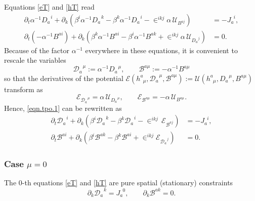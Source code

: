 \documentclass[
10pt, %
a4paper, %
oneside, %
headinclude,footinclude, %
BCOR5mm, %
]{scrartcl}
\newcommand{\pd}[1]{\partial_{#1}}
\newcommand{\tetrsymbol}{h}
\newcommand{\tetr}[2]{\tetrsymbol^{#1}_{\phantom{#1}#2}}
\newcommand{\dT}[2]{D_{#1}^{\phantom{#1}\,#2}}	%
\newcommand{\ddT}[2]{\mathcal{D}_{#1}^{\phantom{#1}\,#2}}	%
\newcommand{\bT}[2]{B^{#1#2}}	%
\newcommand{\bbT}[2]{\mathcal{B}^{#1#2}}	%
\newcommand{\LagST}{\mathcal{U}}%
\newcommand{\Lagtpo}{\mathcal{E}}%
\newcommand{\LCsymb}{\bm{\in}}    %
\newcommand{\NC}[2]{J^{\phantom{#1}#2}_{#1}}
\newcommand{\lapse}{\alpha}
\newcommand{\shift}[1]{\beta^{#1}}
\begin{document}
Equations \eqref{eT} and \eqref{hT} read
\begin{subequations}\label{eqn.tpo.1}
	\begin{align}
		\pd{t} \lapse^{-1}\dT{a}{i} + \pd{k}(\shift{i} 
		\lapse^{-1}\dT{a}{k} - \shift{k}\lapse^{-1}\dT{a}{i}  - \LCsymb^{ikj} \lapse \,
		\LagST_{\bT{a}{j}}) & 
		= -\NC{a}{i}, \\[2mm]
%
		\pd{t} (-\lapse^{-1}\bT{a}{i}) + \pd{k}(\shift{k} 
		\lapse^{-1}\bT{a}{i} - \shift{i}\lapse^{-1}\bT{a}{k}  + \LCsymb^{ikj} \lapse \,
		\LagST_{\dT{a}{j}}) & 
		= 0 .
	\end{align}
\end{subequations}
Because of the factor $ \alpha^{-1} $ everywhere in these equations, it is convenient to rescale 
the 
variables 
\begin{equation}\label{eq.varDB.final}
	\ddT{a}{\mu} := \lapse^{-1} \dT{a}{\mu}, \qquad \bbT{a}{\mu} := -\lapse^{-1}\bT{a}{\mu}
\end{equation}
so that the derivatives of the potential $ \Lagtpo(\tetr{a}{\mu},\ddT{a}{\mu},\bbT{a}{\mu}) := 
\LagST(\tetr{a}{\mu},\dT{a}{\mu},\bT{a}{\mu})
$ 
transform as
\begin{equation}
	\Lagtpo_{\ddT{a}{\mu}} =  \lapse \, \LagST_{\dT{a}{\mu}},
	\qquad
	\Lagtpo_{\bbT{a}{\mu}} = -\lapse \, \LagST_{\bT{a}{\mu}}.
\end{equation}
Hence, \eqref{eqn.tpo.1} can be rewritten as
\begin{subequations}\label{eqn.tpo.2}
	\begin{align}
	\pd{t} \ddT{a}{i} + \pd{k}(\shift{i} 
	\ddT{a}{k} - \shift{k}\ddT{a}{i}  - \LCsymb^{ikj} \,
	\Lagtpo_{\bbT{a}{j}}) & 
	= -\NC{a}{i}, \label{eqn.tpo.D}\\[2mm]
	\pd{t} \bbT{a}{i} + \pd{k}(\shift{i} 
	\bbT{a}{k} - \shift{k}\bbT{a}{i}  + \LCsymb^{ikj} 
	\Lagtpo_{\ddT{a}{j}}) & 
	= 0\label{eqn.tpo.B} .
	\end{align}
\end{subequations}



\subsubsection{Case $ \mu = 0 $} 

The $ 0 $-th equations \eqref{eT} and \eqref{hT} are pure spatial (stationary) constraints
\begin{equation}\label{eq.div.constr}
	\pd{k} \ddT{a}{k} = \NC{a}{0}, 
	\qquad
	\pd{k} \bbT{a}{k} = 0.
\end{equation}
\end{document}
